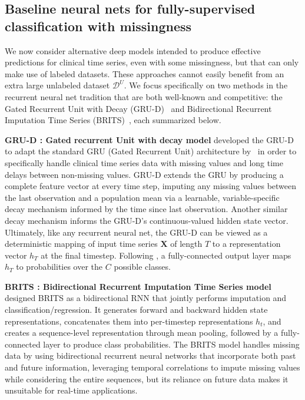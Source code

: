 \subsection{Baseline neural nets for fully-supervised classification with missingness}
\label{sec:baselines_RNN}

We now consider alternative deep models intended to produce effective predictions for clinical time series, even with some missingness, but that can only make use of labeled datasets. These approaches cannot easily benefit from an extra large unlabeled dataset $\mathcal{D}^U$. We focus specifically on two methods in the recurrent neural net tradition that are both well-known and competitive: the Gated Recurrent Unit with Decay (GRU-D)~\citep{cheRecurrentNeuralNetworks2018} and Bidirectional Recurrent Imputation Time Series (BRITS)~\citep{caoBRITSBidirectionalRecurrent2018}, each summarized below.

\textbf{GRU-D : Gated recurrent Unit with decay model} \citep{cheRecurrentNeuralNetworks2018} developed the GRU-D to adapt the standard GRU (Gated Recurrent Unit) architecture by~\citep{gru_original} in order to specifically handle clinical time series data with missing values and long time delays between non-missing values. 
GRU-D extends the GRU by producing a complete feature vector at every time step, imputing any missing values between the last observation and a population mean via a  learnable, variable-specific decay mechanism informed by the time since last observation. Another similar decay mechanism informs the GRU-D's continuous-valued hidden state vector.
Ultimately, like any recurrent neural net, the GRU-D can be viewed as a deterministic mapping of input time series $\mathbf{X}$ of length $T$ to a representation vector $h_T$ at the final timestep. Following \citep{cheRecurrentNeuralNetworks2018}, a fully-connected output layer maps $h_T$ to probabilities over the $C$ possible classes. 

\textbf{BRITS : Bidirectional Recurrent Imputation Time Series model} \citep{caoBRITSBidirectionalRecurrent2018} designed BRITS as a bidirectional RNN that jointly performs imputation and classification/regression. It generates forward and backward hidden state representations, concatenates them into per-timestep representations $h_t$, and creates a sequence-level representation through mean pooling, followed by a fully-connected layer to produce class probabilities. The BRITS model handles missing data by using bidirectional recurrent neural networks that incorporate both past and future information, leveraging temporal correlations to impute missing values while considering the entire sequences, but its reliance on future data makes it unsuitable for real-time applications.


